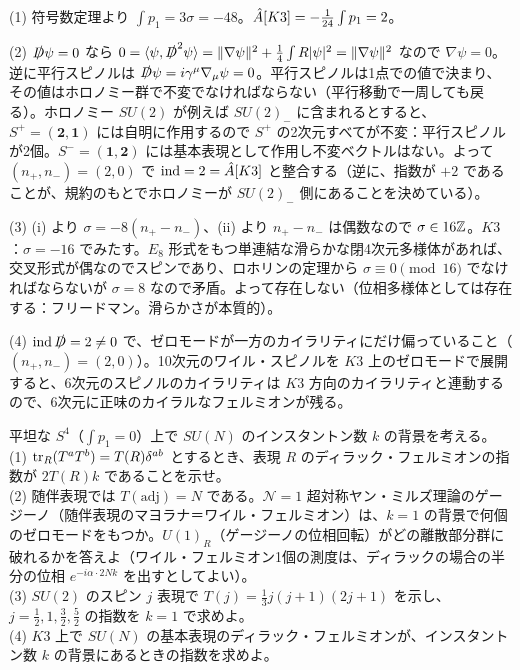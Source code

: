 \begin{solution}
(1) 符号数定理より $\int p_1=3\sigma=-48$。$\hat{A}[K3]=-\frac1{24}\int p_1=2$。

(2) $\slashed D\psi=0$ なら $0=\langle\psi,\slashed D^2\psi\rangle=\lVert\nabla\psi\rVert^2+\frac14\int R\lvert\psi\rvert^2=\lVert\nabla\psi\rVert^2$ なので $\nabla\psi=0$。逆に平行スピノルは $\slashed D\psi=i\gamma^\mu\nabla_\mu\psi=0$。平行スピノルは1点での値で決まり、その値はホロノミー群で不変でなければならない（平行移動で一周しても戻る）。ホロノミー $SU(2)$ が例えば $SU(2)_-$ に含まれるとすると、$S^+=(\mathbf 2,\mathbf 1)$ には自明に作用するので $S^+$ の2次元すべてが不変：平行スピノルが2個。$S^-=(\mathbf 1,\mathbf 2)$ には基本表現として作用し不変ベクトルはない。よって $(n_+,n_-)=(2,0)$ で $\operatorname{ind}=2=\hat{A}[K3]$ と整合する（逆に、指数が $+2$ であることが、規約のもとでホロノミーが $SU(2)_-$ 側にあることを決めている）。

(3) (i) より $\sigma=-8(n_+-n_-)$、(ii) より $n_+-n_-$ は偶数なので $\sigma\in16\mathbb{Z}$。$K3$：$\sigma=-16$ でみたす。$E_8$ 形式をもつ単連結な滑らかな閉4次元多様体があれば、交叉形式が偶なのでスピンであり、ロホリンの定理から $\sigma\equiv0\pmod{16}$ でなければならないが $\sigma=8$ なので矛盾。よって存在しない（位相多様体としては存在する：フリードマン。滑らかさが本質的）。

(4) $\operatorname{ind}\slashed D=2\ne0$ で、ゼロモードが一方のカイラリティにだけ偏っていること（$(n_+,n_-)=(2,0)$）。10次元のワイル・スピノルを $K3$ 上のゼロモードで展開すると、6次元のスピノルのカイラリティは $K3$ 方向のカイラリティと連動するので、6次元に正味のカイラルなフェルミオンが残る。
\end{solution}

\begin{problem}[難易度 B]\label{ch09-prob-reps}
平坦な $S^4$（$\int p_1=0$）上で $SU(N)$ のインスタントン数 $k$ の背景を考える。\\
(1) $\tr_R(T^aT^b)=T(R)\delta^{ab}$ とするとき、表現 $R$ のディラック・フェルミオンの指数が $2T(R)k$ であることを示せ。\\
(2) 随伴表現では $T(\mathrm{adj})=N$ である。$\mathcal N=1$ 超対称ヤン・ミルズ理論のゲージーノ（随伴表現のマヨラナ＝ワイル・フェルミオン）は、$k=1$ の背景で何個のゼロモードをもつか。$U(1)_R$（ゲージーノの位相回転）がどの離散部分群に破れるかを答えよ（ワイル・フェルミオン1個の測度は、ディラックの場合の半分の位相 $e^{-i\alpha\cdot2Nk}$ を出すとしてよい）。\\
(3) $SU(2)$ のスピン $j$ 表現で $T(j)=\frac13j(j+1)(2j+1)$ を示し、$j=\frac12,1,\frac32,\frac52$ の指数を $k=1$ で求めよ。\\
(4) $K3$ 上で $SU(N)$ の基本表現のディラック・フェルミオンが、インスタントン数 $k$ の背景にあるときの指数を求めよ。
\end{problem}

